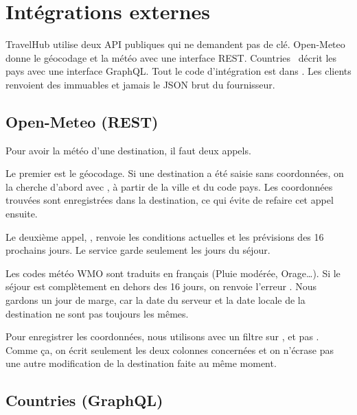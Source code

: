 \section{Intégrations externes}
\label{sec:integrations}

TravelHub utilise deux API publiques qui ne demandent pas de clé. Open-Meteo~\cite{openmeteo,openmeteogeo} donne le géocodage et la météo avec une interface REST. Countries~\cite{countries} décrit les pays avec une interface GraphQL. Tout le code d'intégration est dans . Les clients renvoient des  immuables et jamais le JSON brut du fournisseur.

\subsection{Open-Meteo (REST)}

Pour avoir la météo d'une destination, il faut deux appels.

Le premier est le géocodage. Si une destination a été saisie sans coordonnées, on la cherche d'abord avec , à partir de la ville et du code pays. Les coordonnées trouvées sont enregistrées dans la destination, ce qui évite de refaire cet appel ensuite.

Le deuxième appel, , renvoie les conditions actuelles et les prévisions des 16 prochains jours. Le service garde seulement les jours du séjour.

Les codes météo WMO sont traduits en français (\og{}Pluie modérée\fg{}, \og{}Orage\fg{}\ldots). Si le séjour est complètement en dehors des 16 jours, on renvoie l'erreur . Nous gardons un jour de marge, car la date du serveur et la date locale de la destination ne sont pas toujours les mêmes.

Pour enregistrer les coordonnées, nous utilisons  avec un filtre sur , et pas . Comme ça, on écrit seulement les deux colonnes concernées et on n'écrase pas une autre modification de la destination faite au même moment.

\subsection{Countries (GraphQL)}

